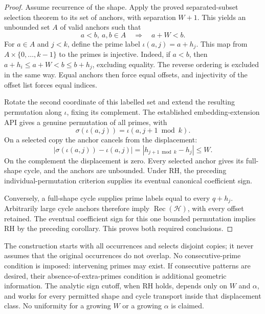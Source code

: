 \documentclass[11pt]{article}
\theoremstyle{definition}
\begin{document}
\begin{proof}
Assume recurrence of the shape. Apply the proved separated-subset
selection theorem to its set of anchors, with separation $W+1$.
This yields an unbounded set $A$ of valid anchors such that
\[
 a<b,\ a,b\in A\quad\Longrightarrow\quad a+W<b.
\]
For $a\in A$ and $j<k$, define the prime label
$\iota(a,j)=a+h_j$.
This map from $A\times\{0,\ldots,k-1\}$ to the primes is injective.
Indeed, if $a<b$, then
$a+h_i\le a+W<b\le b+h_j$, excluding equality.
The reverse ordering is excluded in the same way.
Equal anchors then force equal offsets, and injectivity of the
offset list forces equal indices.

Rotate the second coordinate of this labelled set and extend the
resulting permutation along $\iota$, fixing its complement.
The established embedding-extension API gives a genuine permutation
of all primes, with
\[
 \sigma(\iota(a,j))=\iota(a,j+1\bmod k).
\]
On a selected copy the anchor cancels from the displacement:
\[
 |\sigma(\iota(a,j))-\iota(a,j)|
      =|h_{j+1\bmod k}-h_j|\le W.
\]
On the complement the displacement is zero.
Every selected anchor gives its full-shape cycle, and the anchors
are unbounded. Under RH, the preceding individual-permutation
criterion supplies its eventual canonical coefficient sign.

Conversely, a full-shape cycle supplies prime labels equal to every
$q+h_j$. Arbitrarily large cycle anchors therefore imply
$\operatorname{Rec}(\mathcal H)$, with every offset retained.
The eventual coefficient sign for this one bounded permutation implies
RH by the preceding corollary. This proves both required conclusions.
\end{proof}

The construction starts with all occurrences and selects disjoint copies;
it never assumes that the original occurrences do not overlap.
No consecutive-prime condition is imposed: intervening primes may exist.
If consecutive patterns are desired, their absence-of-extra-primes
condition is additional geometric information. The analytic sign cutoff,
when RH holds, depends only on $W$ and $\alpha$, and works for every
permitted shape and cycle transport inside that displacement class.
No uniformity for a growing $W$ or a growing $\alpha$ is claimed.
\end{document}
